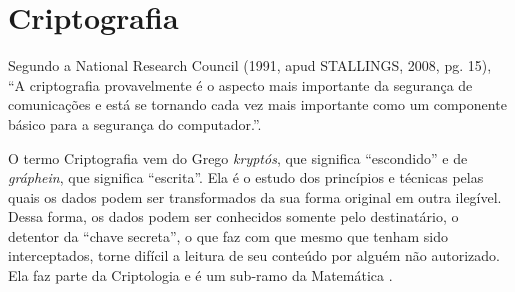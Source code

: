 


\section{Criptografia}
\label{sec:criptografia}
Segundo a National Research Council (1991, apud STALLINGS, 2008, pg. 15), “A criptografia provavelmente é o aspecto mais importante da segurança de comunicações e está se tornando cada vez mais importante como um componente básico para a segurança do computador.”.

O termo Criptografia vem do Grego \textit{kryptós}, que significa “escondido” e de \textit{gráphein}, que significa “escrita”. Ela é o estudo dos princípios e técnicas pelas quais os dados podem ser transformados da sua forma original em outra ilegível. Dessa forma, os dados podem ser conhecidos somente pelo destinatário, o detentor da “chave secreta”, o que faz com que mesmo que tenham sido interceptados, torne difícil a leitura de seu conteúdo por alguém não autorizado. Ela faz parte da Criptologia e é um sub-ramo da Matemática \cite{knudsen98}.


